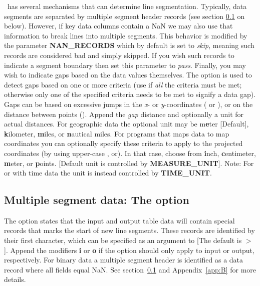 \GMT\ has several mechanisms that can determine line segmentation.  Typically, data segments are
separated by multiple segment header records (see section \ref{sec:multsegments} on  below).  However, if key data
columns contain a NaN we may also use that information to break lines into multiple
segments.  This behavior is modified by the parameter {\bf NAN\_RECORDS} which
by default is set to {\it skip}, meaning such records are considered bad and simply
skipped.  If you wish such records to indicate a segment boundary then set this parameter
to {\it pass}.  Finally, you may wish to indicate gaps based on the data values themselves.
The  option is used to detect gaps based on one or more criteria (use  if
\emph{all} the criteria must be met; otherwise only one of the specified criteria needs
to be met to signify a data gap).  Gaps can be based on excessive jumps in the {\it x}- or
{\it y}-coordinates ( or ), or on the distance between points ().
Append the {\it gap} distance and optionally a unit for actual distances.
For geographic data the optional unit may be m{\bf e}ter [Default], {\bf k}ilometer, {\bf m}iles, or {\bf n}autical miles.
For programs that maps data to map coordinates you can optionally specify these criteria to apply to
the projected coordinates (by using upper-case ,  or).
In that case, choose from {\bf i}nch, {\bf c}entimeter, {\bf m}eter, or {\bf p}oints.
[Default unit is controlled by {\bf MEASURE\_UNIT}].
Note: For  or  with time data the unit is instead controlled by {\bf TIME\_UNIT}.

\subsection{Multiple segment data: The  option}
\label{sec:multsegments}

The  option states that the input and output table data will contain special records
that marks the start of new line segments.  These records are identified by their first
character, which can be specified as an argument to  [The default is $>$].
Append the modifiers {\bf i} or {\bf o} if the option should only apply to input or output,
respectively.  For binary data a multiple segment header is identified as a data record
where all fields equal NaN.  See section~\ref{sec:multsegments} and Appendix~\ref{app:B} for more details.

